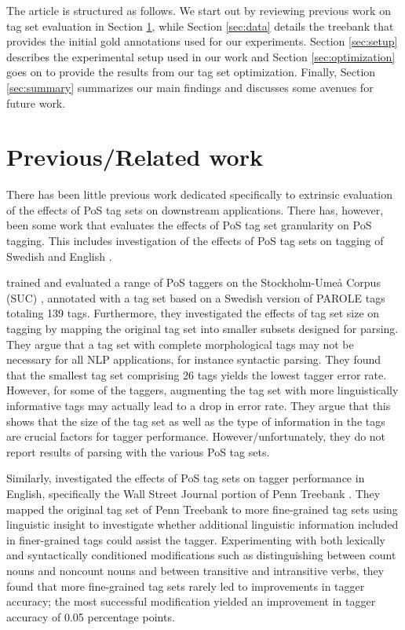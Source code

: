 \documentclass[11pt,a4paper]{article}
\begin{document}
The article is structured as follows. We start out by reviewing
previous work on tag set evaluation in Section \ref{sec:prev}, while
Section \ref{sec:data} details the treebank that provides the initial gold 
annotations used for our experiments. Section \ref{sec:setup} describes the experimental
setup used in our work and Section \ref{sec:optimization} goes on to
provide the results from our tag set optimization. Finally,
Section \ref{sec:summary} summarizes our main findings and discusses
some avenues for future work.

\section{Previous/Related work}
\label{sec:prev}
There has been little previous work dedicated specifically to
extrinsic evaluation of the effects of PoS tag sets on downstream
applications.  There has, however, been some work that evaluates the
effects of PoS tag set granularity on PoS tagging. This includes
investigation of the effects of PoS tag sets on tagging of Swedish
\cite{Meg:01,Meg:02} and English \cite{Mac:05}.


\cite{Meg:01,Meg:02} trained and evaluated a range of PoS taggers on the
Stockholm-Umeå Corpus (SUC) \cite{Gus:Har:06}, annotated with a tag set based
on a Swedish version of PAROLE tags totaling 139 tags. Furthermore, they
investigated the effects of tag set size on tagging by mapping the original tag
set into smaller subsets designed for parsing. They argue that a tag set with
complete morphological tags may not be necessary for all NLP applications, for
instance syntactic parsing. They found that the smallest tag set comprising 26
tags yields the lowest tagger error rate. However, for some of the taggers,
augmenting the tag set with more linguistically informative tags may actually
lead to a drop in error rate. They argue that this shows that the size of the
tag set as well as the type of information in the tags are crucial factors for
tagger performance. However/unfortunately, they do not report results of
parsing with the various PoS tag sets.

Similarly,  investigated the effects of PoS tag sets on tagger
performance in English, specifically the Wall Street Journal portion of Penn
Treebank \cite{Mar:San:Mar:93}. They mapped the original tag set of Penn
Treebank to more fine-grained tag sets using linguistic insight to investigate
whether additional linguistic information included in finer-grained tags could
assist the tagger. Experimenting with both lexically and syntactically
conditioned modifications such as distinguishing between count nouns and
noncount nouns and between transitive and intransitive verbs, they found that
more fine-grained tag sets rarely led to improvements in tagger accuracy; the
most successful modification yielded an improvement in tagger accuracy of 0.05
percentage points.
\end{document}
